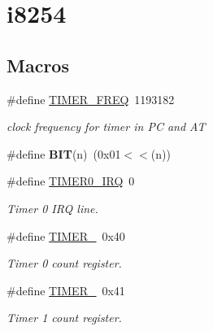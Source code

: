 \hypertarget{group__i8254}{}\section{i8254}
\label{group__i8254}
\subsection*{Macros}
\begin{DoxyCompactItemize}
\item 
\mbox{\label{group__i8254_gacf926951944b6cf370b7229ebd50dd8b}} 
\#define \hyperlink{group__i8254_gacf926951944b6cf370b7229ebd50dd8b}{T\+I\+M\+E\+R\+\_\+\+F\+R\+EQ}~1193182
\begin{DoxyCompactList}\small\item\em clock frequency for timer in PC and AT \end{DoxyCompactList}\item 
\mbox{\label{group__i8254_ga3a8ea58898cb58fc96013383d39f482c}} 
\#define {\bfseries B\+IT}(n)~(0x01$<$$<$(n))
\item 
\mbox{\label{group__i8254_ga30bf84c312af248cb81bb224e09f9ba8}} 
\#define \hyperlink{group__i8254_ga30bf84c312af248cb81bb224e09f9ba8}{T\+I\+M\+E\+R0\+\_\+\+I\+RQ}~0
\begin{DoxyCompactList}\small\item\em Timer 0 I\+RQ line. \end{DoxyCompactList}\item 
\mbox{\label{group__i8254_gacc9ff9df4a9674a1ce9ba08fc4a4679e}} 
\#define \hyperlink{group__i8254_gacc9ff9df4a9674a1ce9ba08fc4a4679e}{T\+I\+M\+E\+R\+\_}~0x40
\begin{DoxyCompactList}\small\item\em Timer 0 count register. \end{DoxyCompactList}\item 
\mbox{\label{group__i8254_gac62c99c2a9289891c1b83052242cca49}} 
\#define \hyperlink{group__i8254_gac62c99c2a9289891c1b83052242cca49}{T\+I\+M\+E\+R\+\_}~0x41
\begin{DoxyCompactList}\small\item\em Timer 1 count register. \end{DoxyCompactList}\item 
$$
\end{DoxyCompactItemize}
